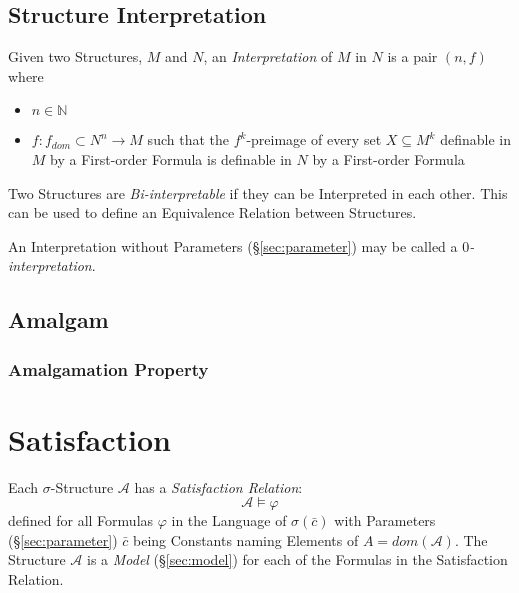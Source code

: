 \subsection{Structure Interpretation}
\label{sec:structure_interpretation}

Given two Structures, $M$ and $N$, an \emph{Interpretation} of $M$ in
$N$ is a pair $(n,f)$ where
\begin{itemize}
  \item $n \in \mathbb{N}$
  \item $f:f_{dom} \subset N^n \rightarrow M$ such that the
    $f^k$-preimage of every set $X \subseteq M^k$ definable in $M$ by
    a First-order Formula is definable in $N$ by a First-order Formula
\end{itemize}

Two Structures are \emph{Bi-interpretable} if they can be Interpreted
in each other. This can be used to define an Equivalence Relation
between Structures.

An Interpretation without Parameters (\S\ref{sec:parameter}) may be
called a \emph{$0$-interpretation}.



\subsection{Amalgam}\label{sec:amalgam}

\subsubsection{Amalgamation Property}\label{sec:amalgamation_property}



\section{Satisfaction}\label{sec:satisfaction}

Each $\sigma$-Structure $\mathcal{A}$ has a \emph{Satisfaction
  Relation}:
\[
  \mathcal{A} \models \varphi
\]
defined for all Formulas $\varphi$ in the Language of
$\sigma(\bar{c})$ with Parameters (\S\ref{sec:parameter}) $\bar{c}$
being Constants naming Elements of $A = dom(\mathcal{A})$. The
Structure $\mathcal{A}$ is a \emph{Model} (\S\ref{sec:model}) for each
of the Formulas in the Satisfaction Relation.

